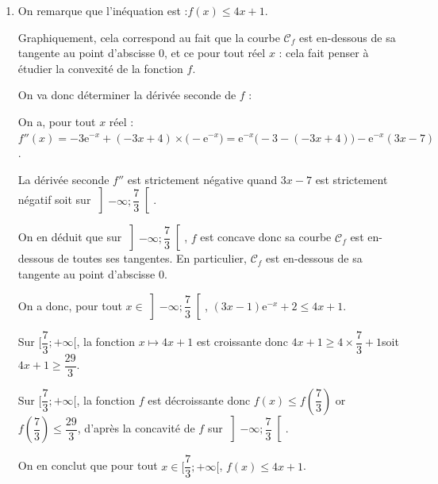 \documentclass[10pt]{article}
\providecommand{\e}{{\mathrm{e}}}
\begin{document}
\begin{enumerate}
\begin{enumerate}
			\item Sur l'intervalle $\big[0  ; 2 \big]$, la fonction $f$ est positive donc l'aire du domaine limité par la courbe $\mathcal{C}_f$, l'axe de abscisses et les droites d'équation $x = 0$ et $x = 2$ est $\mathcal{A}=\displaystyle \int_0^2 f(x) dx$.

			$\begin{aligned}[t] \mathcal{A}&=\displaystyle \int_0^2 f(x) dx \\
			&= \bigg[ F(x) \bigg]_0^2 \\
			&= F(2) - F(0) \\
			&= -8\e^2 +4 +2 \\
			&=6-8\e^2
			\end{aligned}$

			L'aire du domaine limité par la courbe $\mathcal{C}_f$, l'axe de abscisses et les droites d'équation $x = 0$ et $x = 2$ mesure $6-8\e^2$ unités d'aire.
		\end{enumerate}

		\item On remarque que l'inéquation est :\quad $f(x) \leqslant 4x + 1$.

		Graphiquement, cela correspond au fait que la courbe $\mathcal{C}_f$ est en-dessous de sa tangente au point d'abscisse 0, et ce pour tout réel $x$ : cela fait penser à étudier la convexité de la fonction $f$.

		On va donc déterminer la dérivée seconde de $f$ :

		On a, pour tout $x$ réel :\quad  $f''(x)= -3\e^{-x} + (-3x + 4)\times \big(-\e^{-x}\big) = \e^{-x} \big(-3 - (-3x+4)\big)-\e^{-x} (3x-7)$.

		La dérivée seconde $f''$ est strictement négative quand $3x-7$ est strictement négatif soit sur $\left] -\infty  ; \dfrac73 \right[$.

		On en déduit que sur $\left] -\infty  ; \dfrac73 \right[$, $f$ est concave donc sa courbe $\mathcal{C}_f$ est en-dessous de toutes ses tangentes. En particulier, $\mathcal{C}_f$ est en-dessous de sa tangente au point d'abscisse 0.

		On a donc, pour tout $x \in \left] -\infty  ; \dfrac73 \right[$, \quad $(3x - 1)\e^{-x} + 2 \leqslant 4x + 1$.

		Sur $\bigg[ \dfrac73  ; +\infty \bigg[$, la fonction \quad $x \longmapsto 4x+1$ \quad est croissante donc \quad $4x+1 \geqslant 4 \times \dfrac73 +1$\quad soit \quad $4x+1 \geqslant \dfrac{29}{3}$.

		Sur $\bigg[ \dfrac73  ; +\infty \bigg[$, la fonction $f$ est décroissante donc \quad $f(x) \leqslant f\left( \dfrac73 \right)$ \quad or $f\left( \dfrac73 \right) \leqslant \dfrac{29}{3}$, \quad d'après la concavité de $f$ sur $\left] -\infty  ; \dfrac73 \right[$.

		On en conclut que pour tout $x \in \bigg[ \dfrac73  ; +\infty \bigg[$, \quad $f(x) \leqslant 4x+1$.
	\end{enumerate}

\end{document}
